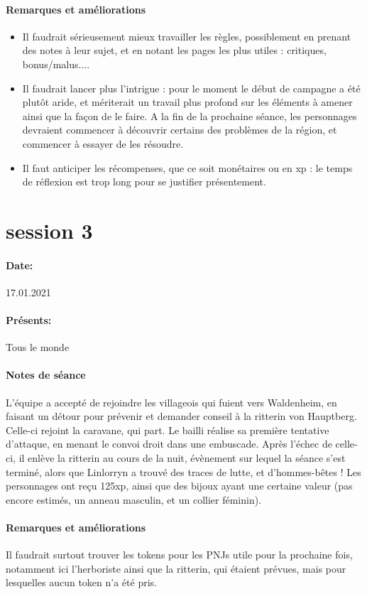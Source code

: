 \documentclass[10pt,a4paper]{book}
\begin{document}
\paragraph{Remarques et améliorations}
\begin{itemize}
\item Il faudrait sérieusement mieux travailler les règles, possiblement en prenant des notes à leur sujet, et en notant les pages les plus utiles : critiques, bonus/malus....
\item Il faudrait lancer plus l'intrigue : pour le moment le début de campagne a été plutôt aride, et mériterait un travail plus profond sur les éléments à amener ainsi que la façon de le faire. A la fin de la prochaine séance, les personnages devraient commencer à découvrir certains des problèmes de la région, et commencer à essayer de les résoudre.
\item Il faut anticiper les récompenses, que ce soit monétaires ou en xp : le temps de réflexion est trop long pour se justifier présentement.
\end{itemize}
\section{session 3}
\paragraph{Date:} 17.01.2021
\paragraph{Présents:}Tous le monde
\paragraph{Notes de séance} L'équipe a accepté de rejoindre les villageois qui fuient vers Waldenheim, en faisant un détour pour prévenir et demander conseil à la ritterin von Hauptberg. Celle-ci rejoint la caravane, qui part. Le bailli réalise sa première tentative d'attaque, en menant le convoi droit dans une embuscade. Après l'échec de celle-ci, il enlève la ritterin au cours de la nuit, évènement sur lequel la séance s'est terminé, alors que Linlorryn a trouvé des traces de lutte, et d'hommes-bêtes ! Les personnages ont reçu 125xp, ainsi que des bijoux ayant une certaine valeur (pas encore estimés, un anneau masculin, et un collier féminin).
\paragraph{Remarques et améliorations}
Il faudrait surtout trouver les tokens pour les PNJs utile pour la prochaine fois, notamment ici l'herboriste ainsi que la ritterin, qui étaient prévues, mais pour lesquelles aucun token n'a été pris.
\end{document}

